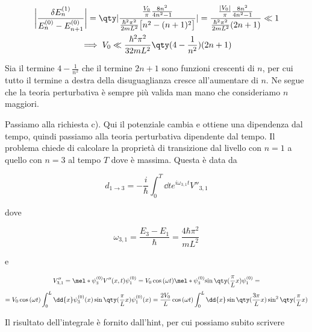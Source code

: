 \begin{soluzione}
   \begin{gather*}
      \biggl| \frac{\delta E_n^{(1)}}{ E_n^{(0)} - E_{n + 1}^{(0)} } \biggr|
      =\qty| \frac{ \frac{V_0}{\pi} \frac{8n^2}{4n^2 - 1} }{ \frac{\hbar^2 \pi^2}{2 m L^2} \bigl[ n^2 - (n + 1)^2 \bigr] } |
      =\frac{ \frac{|V_0|}{\pi} \frac{8n^2}{4n^2 - 1} }{ \frac{\hbar^2 \pi^2}{2 m L^2} (2n + 1) }
      \ll 1
      \\
      \implies
      V_0 \ll \frac{\hbar^2 \pi^2}{32 m L^2} \qty( 4 - \frac{1}{n^2} ) ( 2n + 1 )
   \end{gather*}

   Sia il termine $4 - \frac{1}{n^2}$ che il termine $2n + 1$ sono funzioni crescenti di $n$, per cui tutto il termine a destra della disuguaglianza cresce all'aumentare di $n$. Ne segue che la teoria perturbativa è sempre più valida man mano che consideriamo $n$ maggiori.

   Passiamo alla richiesta c). Qui il potenziale cambia e ottiene una dipendenza dal tempo, quindi passiamo alla teoria perturbativa dipendente dal tempo. Il problema chiede di calcolare la proprietà di transizione dal livello con $n=1$ a quello con $n=3$ al tempo $T$ dove è massima. Questa è data da
   
   \begin{equation}
      d_{1 \to 3}
      =-\frac{i}{\hbar} \int_{0}^{T} \dd{t} e^{i \omega_{3,1} t} V''_{3,1}
      \label{eq:ampiezza_probabilit_da_3_a_1}
   \end{equation}

   dove

   \begin{equation*}
      \omega_{3,1}
      =\frac{E_3 - E_1}{\hbar}
      =\frac{4 \hbar \pi^2}{m L^2}
   \end{equation*}

   e

   \begin{gather*}
      V''_{3,1}
      =\mel*{\psi_3^{(0)}}{V''(x,t)}{\psi_1^{(0)}}
      =V_0 \cos{(\omega t)} \mel*{\psi_3^{(0)}}{\sin{ \qty( \frac{\pi}{L} x ) }}{\psi_1^{(0)}}=
      \\[0.1cm]
      =V_0 \cos{(\omega t)} \int_{0}^{L} \dd{x} \psi_3^{(0)}(x) \sin{ \qty( \frac{\pi}{L} x ) } \psi_1^{(0)}(x)
      =\frac{2V_0}{L} \cos{(\omega t)} \int_{0}^{L} \dd{x} \sin{ \qty( \frac{3\pi}{L} x ) } \sin^2{ \qty( \frac{\pi}{L} x ) }
   \end{gather*}

   Il risultato dell'integrale è fornito dall'hint, per cui possiamo subito scrivere


\end{soluzione}
